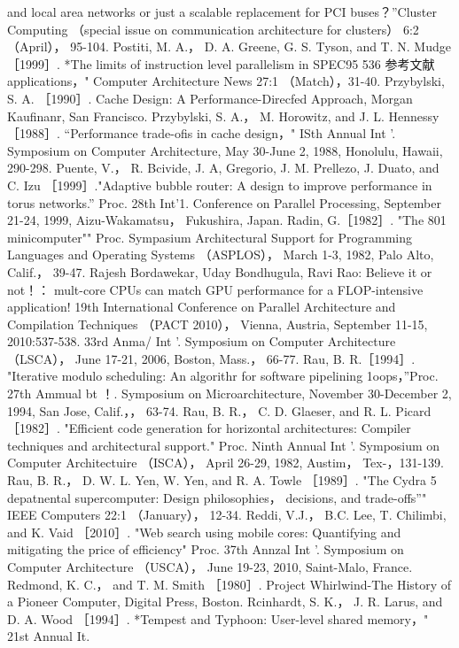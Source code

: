 and local area networks or just a scalable replacement for PCI buses？”Cluster Computing （special issue on communication
architecture for clusters） 6:2 （April）， 95-104.
Postiti, M. A.， D. A. Greene, G. S. Tyson, and T. N. Mudge ［1999］. *The limits of instruction level parallelism in SPEC95
536
参考文献
applications，" Computer Architecture News 27:1 （Match），31-40.
Przybylski, S. A. ［1990］. Cache Design: A Performance-Direcfed Approach, Morgan Kaufinanr, San Francisco.
Przybylski, S. A.， M. Horowitz, and J. L. Hennessy ［1988］. “Performance trade-ofis in cache design，" ISth Annual Int '.
Symposium on Computer Architecture, May 30-June 2, 1988, Honolulu, Hawaii, 290-298.
Puente, V.， R. Bcivide, J. A, Gregorio, J. M. Prellezo, J. Duato, and C. Izu ［1999］."Adaptive bubble router: A design to improve
performance in torus networks.” Proc. 28th Int'1. Conference on Parallel Processing, September 21-24, 1999, Aizu-Wakamatsu，
Fukushira, Japan.
Radin, G.［1982］. "The 801 minicomputer"" Proc. Sympasium Architectural Support for Programming Languages and Operating
Systems （ASPLOS）， March 1-3, 1982, Palo Alto, Calif.， 39-47.
Rajesh Bordawekar, Uday Bondhugula, Ravi Rao: Believe it or not！： mult-core CPUs can match GPU performance for a
FLOP-intensive application! 19th International Conference on Parallel Architecture and Compilation Techniques （PACT
2010）， Vienna, Austria, September 11-15, 2010:537-538.
33rd Anma/ Int '. Symposium on Computer Architecture （LSCA）， June 17-21, 2006, Boston, Mass.， 66-77.
Rau, B. R.［1994］. "Iterative modulo scheduling: An algorithr for software pipelining 1oops，”Proc. 27th Ammual bt ！.
Symposium on Microarchitecture, November 30-December 2, 1994, San Jose, Calif.，， 63-74.
Rau, B. R.， C. D. Glaeser, and R. L. Picard ［1982］. "Efficient code generation for horizontal architectures: Compiler techniques
and architectural support." Proc. Ninth Annual Int '. Symposium on Computer Architectuire （ISCA）， April 26-29, 1982, Austim，
Tex-，131-139.
Rau, B. R.， D. W. L. Yen, W. Yen, and R. A. Towle ［1989］. "The Cydra 5 depatnental supercomputer: Design philosophies，
decisions, and trade-offs”" IEEE Computers 22:1 （January）， 12-34.
Reddi, V.J.， B.C. Lee, T. Chilimbi, and K. Vaid ［2010］. "Web search using mobile cores: Quantifying and mitigating the price of
efficiency" Proc. 37th Annzal Int '. Symposium on Computer Architecture （USCA）， June 19-23, 2010, Saint-Malo, France.
Redmond, K. C.， and T. M. Smith ［1980］. Project Whirlwind-The History of a Pioneer Computer, Digital Press, Boston.
Rcinhardt, S. K.， J. R. Larus, and D. A. Wood ［1994］. *Tempest and Typhoon: User-level shared memory，" 21st Annual It.
